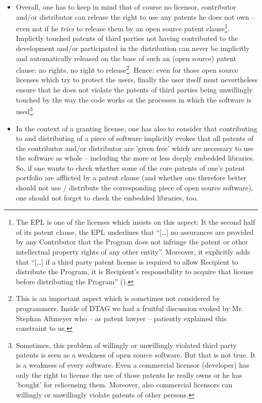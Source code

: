 \begin{itemize}
  
  \item Overall, one has to keep in mind that of course no licensor, contributor
  and/or distributor can release the right to use any patents he does not own --
  even not if he \emph{tries} to release them by an open source patent
  clause\footnote{The EPL is one of the licenses which insists on this aspect:
  It the second half of its patent clause, the EPL underlines that
  \enquote{[\ldots] no assurances are provided by any Contributor that the
  Program does not infringe the patent or other intellectual property rights of
  any other entity}. Moreover, it explicitly adds that \enquote{[\ldots] if a
  third party patent license is required to allow Recipient to distribute the
  Program, it is Recipient's responsibility to acquire that license before
  distributing the Program} (\cite[cf.][\nopage wp
  §2c]{Epl10OsiLicense2005a}).}. Implictly touched patents of third parties not
  having contributed to the development and/or participated in the distribution
  can never be implicitly and automatically released on the base of such an
  (open source) patent clause: no rights, no right to release\footnote{This is
  an important aspect which is sometimes not considered by programmers. Inside
  of DTAG we had a fruitful discussion evoked by Mr. Stephan Altmeyer who -- as
  patent lawyer -- patiently explained this constraint to us.}. Hence: even for
  those open source licenses which try to protect the users, finally the user
  itself must nevertheless ensure that he does not violate the patents of third
  parties being unwillingly touched by the way the code works or the processes
  in which the software is used\footnote{Sometimes, this problem of willingly or
  unwillingly violated third party patents is seen as a weakness of open source
  software. But that is not true. It is a weakness of every software. Even a
  commercial licensor (developer) has only the right to license the use of those
  patents he really owns or he has 'bought' for relicensing them. Moreover, also
  commercial licensors can willingly or unwillingly violate patents of other
  persons.}.
  
  \item In the context of a granting license, one has also to consider that
  contributing to and distributing of a piece of software implicitly evokes that
  all patents of the contributor and/or distributor are 'given free' which are
  necessary to use the software as whole -- including the more or less deeply
  embedded libraries. So, if one wants to check whether some of the core patents
  of one's patent portfolio are afflicted by a patent clause (and whether one
  therefore better should not use / distribute the corresponding piece of open
  source software), one should not forget to check the embedded libraries, too.
  

\end{itemize}
